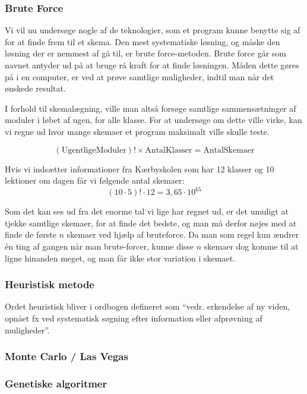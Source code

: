 \subsubsection{Brute Force}
Vi vil nu undersøge nogle af de teknologier, som et program kunne benytte sig af for at finde frem til et skema. Den mest systematiske løsning, og måske den løsning der er nemmest af gå til, er brute force-metoden. Brute force går som navnet antyder ud på at bruge rå kraft for at finde løsningen. Måden dette gøres på i en computer, er ved at prøve samtlige muligheder, indtil man når det ønskede resultat\cite{BruteForce}.

I forhold til skemalægning, ville man altså forsøge samtlige sammensætninger af moduler i løbet af ugen, for alle klasse. For at undersøge om dette ville virke, kan vi regne ud hvor mange skemaer et program maksimalt ville skulle teste.

$$ (\text{UgentligeModuler})! \times \text{AntalKlasser} = \text{AntalSkemaer}$$

Hvis vi indsætter informationer fra Kærbyskolen som har 12 klasser og 10 lektioner om dagen får vi følgende antal skemaer:
$$ (10\cdot 5)! \cdot 12 = 3,65\cdot 10^{65} $$

Som det kan ses ud fra det enorme tal vi lige har regnet ud, er det umuligt at tjekke samtlige skemaer, for at finde det bedste, og man må derfor nøjes med at finde de første $n$ skemaer ved hjælp af bruteforce. Da man som regel kun ændrer \'en ting af gangen når man brute-forcer, kunne disse $n$ skemaer dog komme til at ligne hinanden meget, og man får ikke stor variation i skemaet.

\subsubsection{Heuristisk metode}
Ordet heuristisk bliver i ordbogen defineret som ``vedr. erkendelse af ny viden, opnået fx ved systematisk søgning efter information eller afprøvning af muligheder''\cite{Ordnet}.

\subsubsection{Monte Carlo / Las Vegas}

\subsubsection{Genetiske algoritmer}
